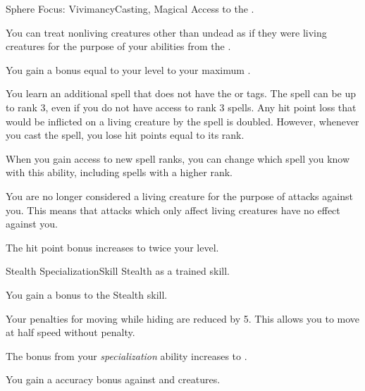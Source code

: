   \begin{magicalfeat}{Sphere Focus: Vivimancy}{Casting, Magical}
    \featpre Access to the  .

     You can treat nonliving creatures other than undead as if they were living creatures for the purpose of your abilities from the  .

     You gain a bonus equal to your level to your maximum .

     You learn an additional spell that does not have the  or  tags.
    The spell can be up to rank 3, even if you do not have access to rank 3 spells.
    Any hit point loss that would be inflicted on a living creature by the spell is doubled.
    However, whenever you cast the spell, you lose hit points equal to its rank.

    When you gain access to new spell ranks, you can change which spell you know with this ability, including spells with a higher rank.

     You are no longer considered a living creature for the purpose of attacks against you.
    This means that attacks which only affect living creatures have no effect against you.

     The hit point bonus increases to twice your level.
  \end{magicalfeat}

  \begin{feat}{Stealth Specialization}{Skill}
    \featpre Stealth as a trained skill.

     You gain a  bonus to the Stealth skill.

     Your penalties for moving while hiding are reduced by 5.
    This allows you to move at half speed without penalty.

     The bonus from your \textit{specialization} ability increases to .

     You gain a  accuracy bonus against \unaware and \partiallyunaware creatures.
  \end{feat}

